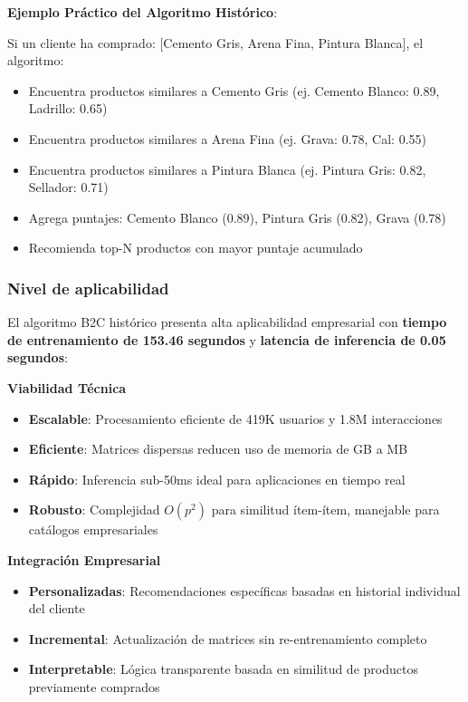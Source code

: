 \documentclass[twocolumn]{article}
\begin{document}
\textbf{Ejemplo Práctico del Algoritmo Histórico}:

Si un cliente ha comprado: [Cemento Gris, Arena Fina, Pintura Blanca], el algoritmo:
\begin{itemize}
    \item Encuentra productos similares a Cemento Gris (ej. Cemento Blanco: 0.89, Ladrillo: 0.65)
    \item Encuentra productos similares a Arena Fina (ej. Grava: 0.78, Cal: 0.55)
    \item Encuentra productos similares a Pintura Blanca (ej. Pintura Gris: 0.82, Sellador: 0.71)
    \item Agrega puntajes: Cemento Blanco (0.89), Pintura Gris (0.82), Grava (0.78)
    \item Recomienda top-N productos con mayor puntaje acumulado
\end{itemize}

\subsubsection{Nivel de aplicabilidad}

El algoritmo B2C histórico presenta alta aplicabilidad empresarial con \textbf{tiempo de entrenamiento de 153.46 segundos} y \textbf{latencia de inferencia de 0.05 segundos}:

\textbf{Viabilidad Técnica}
\begin{itemize}
    \item \textbf{Escalable}: Procesamiento eficiente de 419K usuarios y 1.8M interacciones
    \item \textbf{Eficiente}: Matrices dispersas reducen uso de memoria de GB a MB
    \item \textbf{Rápido}: Inferencia sub-50ms ideal para aplicaciones en tiempo real
    \item \textbf{Robusto}: Complejidad \(O(p^2)\) para similitud ítem-ítem, manejable para catálogos empresariales
\end{itemize}

\textbf{Integración Empresarial}
\begin{itemize}
    \item \textbf{Personalizadas}: Recomendaciones específicas basadas en historial individual del cliente
    \item \textbf{Incremental}: Actualización de matrices sin re-entrenamiento completo
    \item \textbf{Interpretable}: Lógica transparente basada en similitud de productos previamente comprados
\end{itemize}
\end{document}
